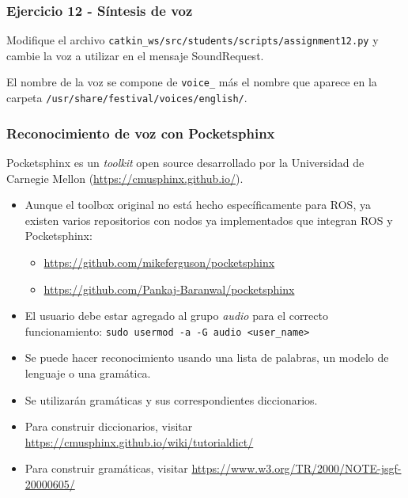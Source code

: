 \begin{frame}[containsverbatim]\frametitle{Ejercicio 12 - Síntesis de voz}
  Modifique el archivo \texttt{catkin\_ws/src/students/scripts/assignment12.py} y cambie la voz a utilizar en el mensaje SoundRequest.
  
  El nombre de la voz se compone de \texttt{voice\_} más el nombre que aparece en la carpeta \texttt{/usr/share/festival/voices/english/}. 
\end{frame}

\begin{frame}\frametitle{Reconocimiento de voz con Pocketsphinx}
  Pocketsphinx es un \textit{toolkit} open source desarrollado por la Universidad de Carnegie Mellon (\url{https://cmusphinx.github.io/}).
  \begin{itemize}
  \item Aunque el toolbox original no está hecho específicamente para ROS, ya existen varios repositorios con nodos ya implementados que integran ROS y Pocketsphinx:
    \begin{itemize}
    \item \url{https://github.com/mikeferguson/pocketsphinx}
    \item \url{https://github.com/Pankaj-Baranwal/pocketsphinx}
    \end{itemize}
  \item El usuario debe estar agregado al grupo \textit{audio} para el correcto funcionamiento: \texttt{sudo usermod -a -G audio <user\_name>}
  \end{itemize}
  \begin{itemize}
  \item Se puede hacer reconocimiento usando una lista de palabras, un modelo de lenguaje o una gramática.
  \item Se utilizarán gramáticas y sus correspondientes diccionarios.
  \item Para construir diccionarios, visitar \url{https://cmusphinx.github.io/wiki/tutorialdict/}
  \item Para construir gramáticas, visitar \url{https://www.w3.org/TR/2000/NOTE-jsgf-20000605/}
  \end{itemize}
\end{frame}

